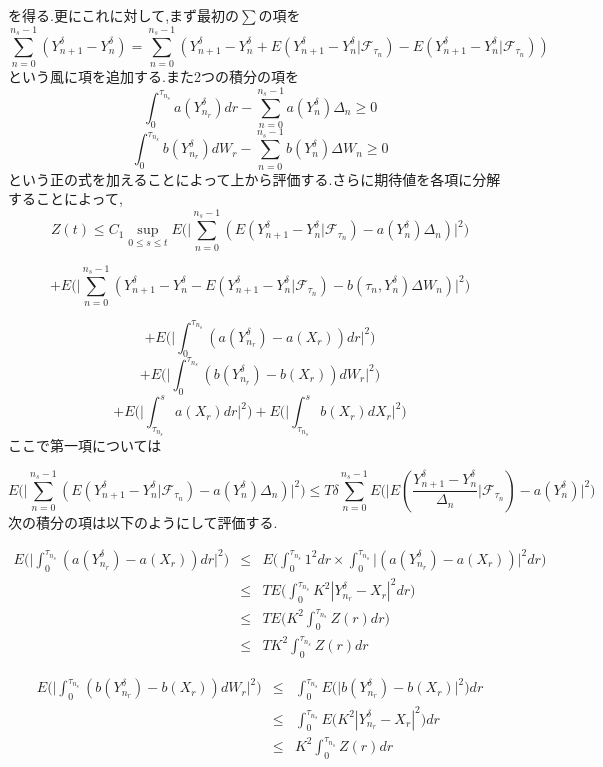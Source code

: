 \documentclass[a4paper,dvipdfmx]{jreport}
\def\F{\mathcal F}
\def\eqa{\begin{eqnarray}}
\def\eqax{\end{eqnarray}}
\begin{document}
を得る.更にこれに対して,まず最初の$\sum$の項を
\[
\sum_{n=0}^{n_s-1}(Y_{n+1}^\delta - Y_n^\delta) = \sum_{n=0}^{n_s-1}(Y_{n+1}^\delta - Y_n^\delta 
+ E(Y_{n+1}^\delta - Y_n^\delta | \F_{\tau_n}) - E(Y_{n+1}^\delta - Y_n^\delta | \F_{\tau_n}))
\]
という風に項を追加する.また2つの積分の項を
\[
\int_0^{\tau_{n_s}} a(Y^\delta_{n_r})dr - \sum_{n=0}^{n_s-1} a(Y_n^\delta)\Delta_n \ge 0
\]
\[
\int_0^{\tau_{n_s}} b(Y^\delta_{n_r})dW_r - \sum_{n=0}^{n_s-1} b(Y_n^\delta)\Delta W_n \ge 0
\]
という正の式を加えることによって上から評価する.さらに期待値を各項に分解することによって,
\[
Z(t)\le C_1  \sup_{0\le s\le t} 
E \big(  \big|
\sum_{n=0}^{n_s-1} (E(Y_{n+1}^\delta - Y_n^\delta | \F_{\tau_n}) - a(Y_n^\delta)\Delta_n )
\big| ^2 \big)
\]

\[
+ E \big( \big|
\sum_{n=0}^{n_s-1} ( Y^\delta_{n+1} - Y^\delta_n
- E(Y^\delta_{n+1} - Y^\delta_n | \F_{\tau_n})
- b(\tau_n,Y_n^\delta)\Delta W_n)
\big| ^2 \big) 
\]

\[
+ E \big( \big|
\int_0^{\tau_{n_s}} ( a(Y^\delta_{n_r}) - a(X_r) )dr 
\big| ^2 \big) 
\]
\[
+ E \big( \big|
\int_0^{\tau_{n_s}} ( b(Y^\delta_{n_r}) - b(X_r) )dW_r 
\big| ^2 \big) 
\]
\[
+ E \big( \big|
\int_{\tau_{n_s}}^s a(X_r)dr
\big| ^2 \big) 
+ E \big( \big|
\int_{\tau_{n_s}}^s b(X_r)dX_r
\big| ^2 \big) 
\]
ここで第一項については

\[
E \big(  \big|
\sum_{n=0}^{n_s-1} (E(Y_{n+1}^\delta - Y_n^\delta | \F_{\tau_n}) - a(Y_n^\delta)\Delta_n )
\big| ^2 \big)
\le
T\delta \sum_{n=0}^{n_s-1} E \big( \big| E( \frac{Y^\delta_{n+1} - Y^\delta_n}{\Delta_n} | \F_{\tau_n})
- a(Y_n^\delta)
 \big|^2 \big)  
\]
次の積分の項は以下のようにして評価する.

\eqa
E \big( \big| \int_0^{\tau_{n_s}} ( a(Y^\delta_{n_r}) - a(X_r) )dr \big| ^2 \big)  &\le&
E \big( \int_0^{\tau_{n_s}} 1^2 dr \times \int_0^{\tau_{n_s}}\big| ( a(Y^\delta_{n_r}) - a(X_r) ) \big| ^2 dr \big) \\
&\le&T E \big(\int_0^{\tau_{n_s}} K^2 |Y^\delta_{n_r} - X_r|^2dr \big) \\
&\le&T E \big(K^2 \int_0^{\tau_{n_s}} Z(r) dr \big) \\
&\le& TK^2 \int_0^{\tau_{n_s}} Z(r) dr
\eqax

\eqa
E \big( \big| \int_0^{\tau_{n_s}} ( b(Y^\delta_{n_r}) - b(X_r) )dW_r  \big| ^2 \big)  &\le&
\int_0^{\tau_{n_s}} E \big(   \big|b(Y^\delta_{n_r}) - b(X_r) \big| ^2 \big) dr   \\
&\le& \int_0^{\tau_{n_s}} E \big(   K^2 |Y^\delta_{n_r} - X_r|^2 \big) dr   \\
&\le&  K^2 \int_0^{\tau_{n_s}}  Z(r) dr 
\eqax
\end{document}
